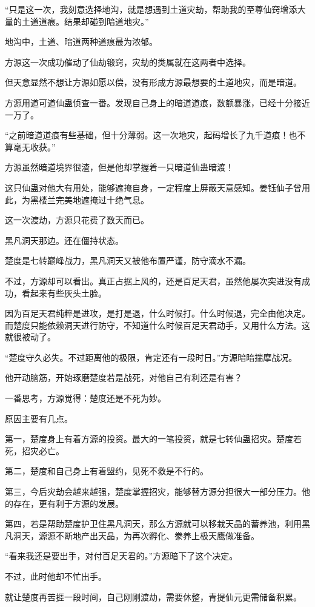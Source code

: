 \begin{this_body}
“只是这一次，我刻意选择地沟，就是想遇到土道灾劫，帮助我的至尊仙窍增添大量的土道道痕。结果却碰到暗道地灾。”

地沟中，土道、暗道两种道痕最为浓郁。

方源这一次成功催动了仙劫锻窍，灾劫的类属就在这两者中选择。

但天意显然不想让方源如愿以偿，没有形成方源最想要的土道地灾，而是暗道。

方源用道可道仙蛊侦查一番。发现自己身上的暗道道痕，数额暴涨，已经十分接近一万了。

“之前暗道道痕有些基础，但十分薄弱。这一次地灾，起码增长了九千道痕！也不算毫无收获。”

方源虽然暗道境界很渣，但是他却掌握着一只暗道仙蛊暗渡！

这只仙蛊对他大有用处，能够遮掩自身，一定程度上屏蔽天意感知。姜钰仙子曾用此，为黑楼兰完美地遮掩过十绝气息。

这一次渡劫，方源只花费了数天而已。

黑凡洞天那边。还在僵持状态。

楚度是七转巅峰战力，黑凡洞天又被他布置严谨，防守滴水不漏。

不过，方源却可以看出。真正占据上风的，还是百足天君，虽然他屡次突进没有成功，看起来有些灰头土脸。

因为百足天君纯粹是进攻，是打是退，什么时候打。什么时候退，完全由他决定。而楚度只能依赖洞天进行防守，不知道什么时候百足天君动手，又用什么方法。这就很被动了。

“楚度守久必失。不过距离他的极限，肯定还有一段时日。”方源暗暗揣摩战况。

他开动脑筋，开始琢磨楚度若是战死，对他自己有利还是有害？

一番思考，方源觉得：楚度还是不死为妙。

原因主要有几点。

第一，楚度身上有着方源的投资。最大的一笔投资，就是七转仙蛊招灾。楚度若死，招灾必亡。

第二，楚度和自己身上有着盟约，见死不救是不行的。

第三，今后灾劫会越来越强，楚度掌握招灾，能够替方源分担很大一部分压力。他的存在，更有利于方源的发展。

第四，若是帮助楚度护卫住黑凡洞天，那么方源就可以移栽天晶的蓄养池，利用黑凡洞天，源源不断地产出天晶，为再次孵化、豢养上极天鹰做准备。

“看来我还是要出手，对付百足天君的。”方源暗下了这个决定。

不过，此时他却不忙出手。

就让楚度再苦捱一段时间，自己刚刚渡劫，需要休整，青提仙元更需储备积累。


\end{this_body}
